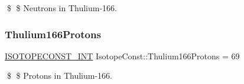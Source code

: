 \$ \$ Neutrons in Thulium-\/166. \mbox{\label{group___isotope_const-_thulium-_tm166_ga16c5d3af96f094296baa7b5760674f74}} 
\subsubsection{\texorpdfstring{Thulium166\+Protons}{Thulium166Protons}}
{\footnotesize\ttfamily \mbox{\hyperlink{group___isotope_const-_macros_ga5f18360b3e99483a35c32d789e62621c}{I\+S\+O\+T\+O\+P\+E\+C\+O\+N\+S\+T\+\_\+\+I\+NT}} Isotope\+Const\+::\+Thulium166\+Protons = 69}

\$ \$ Protons in Thulium-\/166. 